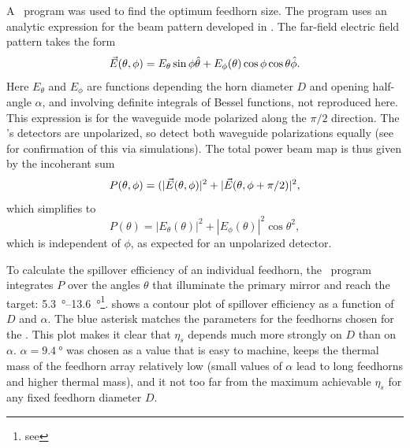A \MATLAB\ program was used to find the optimum feedhorn size.
The program uses an analytic expression for the beam pattern developed in \cite{green_radiation_2006,narasimhan_modes_1971,}.
The far-field electric field pattern takes the form
\begin{equation}
    \vec{E}(\theta,\phi) = E_{\theta} \sin{\phi} \hat{\theta} + E_{\phi}(\theta) \cos{\phi} \cos{\theta} \hat{\phi}.
\end{equation}
Here $E_{\theta}$ and $E_{\phi}$ are functions depending the horn diameter $D$ and opening half-angle $\alpha$, and involving definite integrals of Bessel functions, not reproduced here.
This expression is for the waveguide mode polarized along the $\pi/2$ direction.
The \Imager's detectors are unpolarized, so detect both waveguide polarizations equally (see  for confirmation of this via simulations).
The total power beam map is thus given by the incoherant sum
\begin{equation}
    P(\theta, \phi) = (|\vec{E}(\theta, \phi)|^2 + |\vec{E}(\theta, \phi+\pi/2)|^2,
\end{equation}
which simplifies to 
\begin{equation}
    P(\theta) = |E_{\theta}(\theta)|^2 + |E_{\phi}(\theta)|^2 \cos{\theta}^2,
\end{equation}
which is independent of $\phi$, as expected for an unpolarized detector.

To calculate the spillover efficiency of an individual feedhorn, the \MATLAB\ program integrates $P$ over the angles $\theta$ that illuminate the primary mirror and reach the target: \SIrange{5.3}{13.6}{\degree}\footnote{see }.
 shows a contour plot of spillover efficiency as a function of $D$ and $\alpha$.
The blue asterisk matches the parameters for the feedhorns chosen for the \Imager.
This plot makes it clear that $\eta_s$ depends much more strongly on $D$ than on $\alpha$.
$\alpha = \SI{9.4}{\degree}$ was chosen as a value that is easy to machine, keeps the thermal mass of the feedhorn array relatively low (small values of $\alpha$ lead to long feedhorns and higher thermal mass), and it not too far from the maximum achievable $\eta_s$ for any fixed feedhorn diameter $D$.

